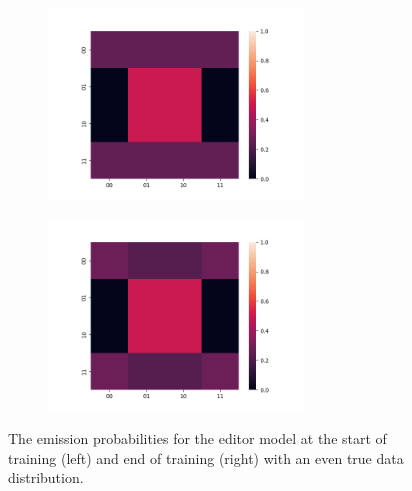 \documentclass[11pt]{article}
\begin{document}
\begin{figure}[h]
\centering
\begin{subfigure}[t]{0.45\textwidth}
\centering
\includegraphics[height=2in]{../plots/even_prior_editor_init.png}
\end{subfigure}
\begin{subfigure}[t]{0.45\textwidth}
\centering
\includegraphics[height=2in]{../plots/even_prior_editor_final.png}
\end{subfigure}
\caption{
\label{fig:editor-toy2}
The emission probabilities for the editor model at the start of training (left)
and end of training (right) with an even true data distribution.
}
\end{figure}
\end{document}
